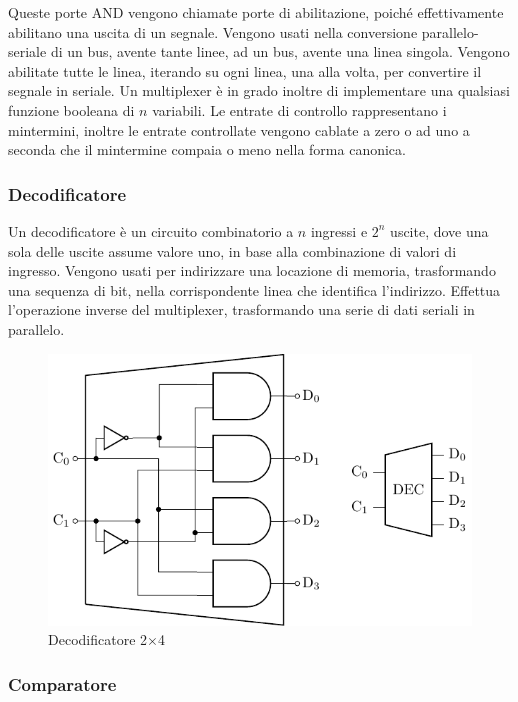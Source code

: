 \documentclass{article}
\numberwithin{equation}{subsection}
\begin{document}
Queste porte AND vengono chiamate porte di abilitazione, poiché effettivamente abilitano una uscita di un segnale. Vengono usati nella conversione parallelo-seriale di un bus, avente tante linee, ad un bus, avente 
una linea singola. Vengono abilitate tutte le linea, iterando su ogni linea, una alla volta, per convertire il segnale in seriale. Un multiplexer è in grado inoltre di implementare una qualsiasi funzione 
booleana di $n$ variabili. Le entrate di controllo rappresentano i mintermini, inoltre le entrate controllate vengono cablate a zero o ad uno a seconda che il mintermine compaia o meno nella forma canonica. 

\subsubsection{Decodificatore}

Un decodificatore è un circuito combinatorio a $n$ ingressi e $2^n$ uscite, dove una sola delle uscite assume valore uno, in base alla combinazione di valori di ingresso. Vengono usati per indirizzare una 
locazione di memoria, trasformando una sequenza di bit, nella corrispondente linea che identifica l'indirizzo. Effettua l'operazione inverse del multiplexer, trasformando una serie di dati seriali in parallelo. 

\begin{figure}[H]%
    \centering%
    \includegraphics{decodificatore-2x4.pdf}%
    \caption{Decodificatore 2$\times$4}%
\end{figure}

\subsubsection{Comparatore}
\end{document}
